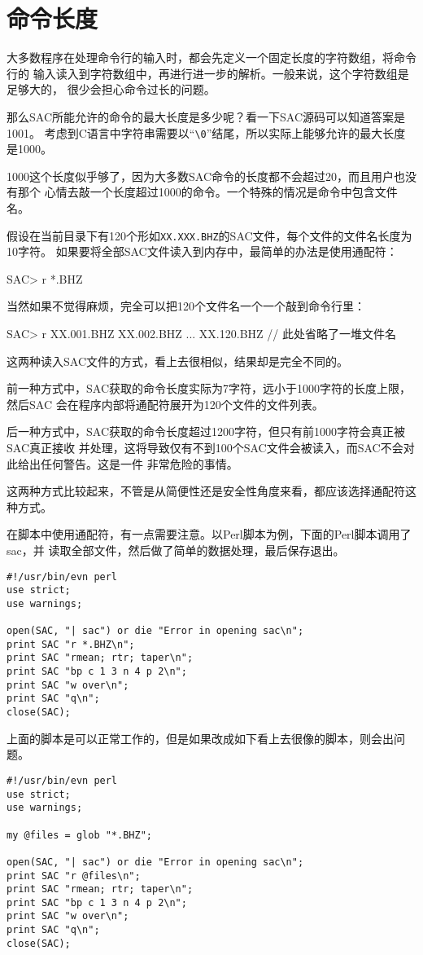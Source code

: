 \section{命令长度}
大多数程序在处理命令行的输入时，都会先定义一个固定长度的字符数组，将命令行的
输入读入到字符数组中，再进行进一步的解析。一般来说，这个字符数组是足够大的，
很少会担心命令过长的问题。

那么SAC所能允许的命令的最大长度是多少呢？看一下SAC源码可以知道答案是1001。
考虑到C语言中字符串需要以“\verb+\0+”结尾，所以实际上能够允许的最大长度是1000。

1000这个长度似乎够了，因为大多数SAC命令的长度都不会超过20，而且用户也没有那个
心情去敲一个长度超过1000的命令。一个特殊的情况是命令中包含文件名。

假设在当前目录下有120个形如\verb+XX.XXX.BHZ+的SAC文件，每个文件的文件名长度为10字符。
如果要将全部SAC文件读入到内存中，最简单的办法是使用通配符：
\begin{SACCode}
SAC> r *.BHZ
\end{SACCode}
当然如果不觉得麻烦，完全可以把120个文件名一个一个敲到命令行里：
\begin{SACCode}
SAC> r XX.001.BHZ XX.002.BHZ ... XX.120.BHZ // 此处省略了一堆文件名
\end{SACCode}

这两种读入SAC文件的方式，看上去很相似，结果却是完全不同的。

前一种方式中，SAC获取的命令长度实际为7字符，远小于1000字符的长度上限，然后SAC
会在程序内部将通配符展开为120个文件的文件列表。

后一种方式中，SAC获取的命令长度超过1200字符，但只有前1000字符会真正被SAC真正接收
并处理，这将导致仅有不到100个SAC文件会被读入，而SAC不会对此给出任何警告。这是一件
非常危险的事情。

这两种方式比较起来，不管是从简便性还是安全性角度来看，都应该选择通配符这种方式。

在脚本中使用通配符，有一点需要注意。以Perl脚本为例，下面的Perl脚本调用了sac，并
读取全部文件，然后做了简单的数据处理，最后保存退出。

\begin{verbatim}
#!/usr/bin/evn perl
use strict;
use warnings;

open(SAC, "| sac") or die "Error in opening sac\n";
print SAC "r *.BHZ\n";
print SAC "rmean; rtr; taper\n";
print SAC "bp c 1 3 n 4 p 2\n";
print SAC "w over\n";
print SAC "q\n";
close(SAC);
\end{verbatim}

上面的脚本是可以正常工作的，但是如果改成如下看上去很像的脚本，则会出问题。
\begin{verbatim}
#!/usr/bin/evn perl
use strict;
use warnings;

my @files = glob "*.BHZ";

open(SAC, "| sac") or die "Error in opening sac\n";
print SAC "r @files\n";
print SAC "rmean; rtr; taper\n";
print SAC "bp c 1 3 n 4 p 2\n";
print SAC "w over\n";
print SAC "q\n";
close(SAC);
\end{verbatim}


